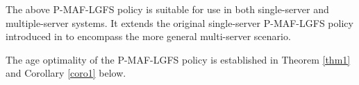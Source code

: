 The above P-MAF-LGFS policy is suitable for use in both single-server and multiple-server systems. It extends the original single-server P-MAF-LGFS policy introduced in \cite{SunAoIWorkshop2018} to encompass the more general multi-server scenario. 

The age optimality of the P-MAF-LGFS policy is established in Theorem \ref{thm1} and Corollary \ref{coro1} below.

 

